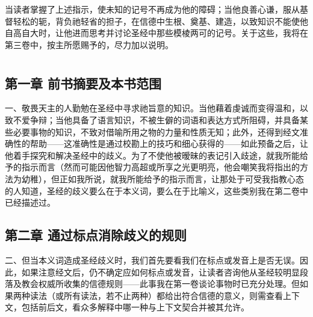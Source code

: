 当读者掌握了上述指示，使未知的记号不再成为他的障碍；当他良善心谦，服从基督轻松的轭，背负祂轻省的担子，在信德中生根、奠基、建造，以致知识不能使他自高自大时，让他进而思考并讨论圣经中那些模棱两可的记号。关于这些，我将在第三卷中，按主所愿赐予的，尽力加以说明。\par



\section{}


\subsection{第一章  前书摘要及本书范围}

一、敬畏天主的人勤勉在圣经中寻求祂旨意的知识。当他藉着虔诚而变得温和，以致不爱争辩；当他具备了语言知识，不被生僻的词语和表达方式所阻碍，并具备某些必要事物的知识，不致对借喻所用之物的力量和性质无知；此外，还得到经文准确性的帮助——这准确性是通过校勘上的技巧和细心获得的——如此预备之后，让他着手探究和解决圣经中的歧义。为了不使他被暧昧的表记引入歧途，就我所能给予的指示而言（然而可能因他智力高超或所享之光更明亮，他会嘲笑我将指出的方法为幼稚），但正如我所说，就我所能给予的指示而言，让那处于可受我指教心态的人知道，圣经的歧义要么在于本义词，要么在于比喻义，这些类别我在第二卷中已经描述过。\par


\subsection{第二章  通过标点消除歧义的规则}

二、但当本义词造成圣经歧义时，我们首先要看我们在标点或发音上是否无误。因此，如果注意经文后，仍不确定应如何标点或发音，让读者咨询他从圣经较明显段落及教会权威所收集的信德规则——此事我在第一卷谈论事物时已充分处理。但如果两种读法（或所有读法，若不止两种）都给出符合信德的意义，则需查看上下文，包括前后文，看众多解释中哪一种与上下文契合并被其允许。\par

